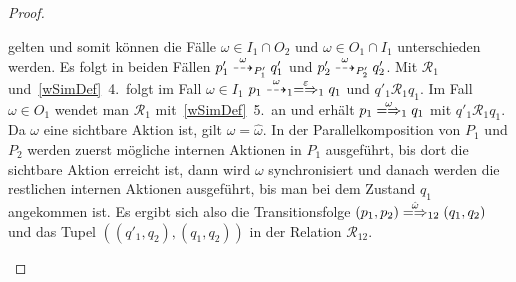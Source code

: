 \begin{proof}
\begin{enumerate}
\begin{itemize}
          gelten und somit können die Fälle $\omega\in I_1\cap O_2$ und
          $\omega\in O_1\cap I_1$ unterschieden werden. Es folgt in beiden
          Fällen $p'_1\may[\omega]_{P'_1} q'_1$ und $p'_2 \may[\omega]_{P'_2}
          q'_2$. Mit $\mathcal{R}_1$ und~\ref{wSimDef}~4.\ folgt im Fall
          $\omega\in I_1$ $p_1\may[\omega]_1 \weakmay[\varepsilon]_1 q_1$ und
          $q'_1 \mathcal{R}_1 q_1$. Im Fall $\omega\in O_1$ wendet man
          $\mathcal{R}_1$ mit~\ref{wSimDef}~5.\ an und erhält $p_1
          \weakmay[\omega]_1 q_1$ mit $q'_1\mathcal{R}_1 q_1$. Da $\omega$
          eine sichtbare Aktion ist, gilt $\omega =\hat{\omega}$. In der
          Parallelkomposition von $P_1$ und $P_2$ werden zuerst mögliche
          internen Aktionen in $P_1$ ausgeführt, bis dort die sichtbare Aktion
          erreicht ist, dann wird $\omega$ synchronisiert und danach werden die
          restlichen internen Aktionen ausgeführt, bis man bei dem Zustand
          $q_1$ angekommen ist. Es ergibt sich also die Transitionsfolge
          $(p_1,p_2) \weakmay[\hat{\omega}]_{12} (q_1,q_2)$ und das Tupel
          $((q'_1,q_2),(q_1,q_2))$ in der Relation $\mathcal{R}_{12}$.
      \end{itemize}
  \end{enumerate}
\end{proof}

